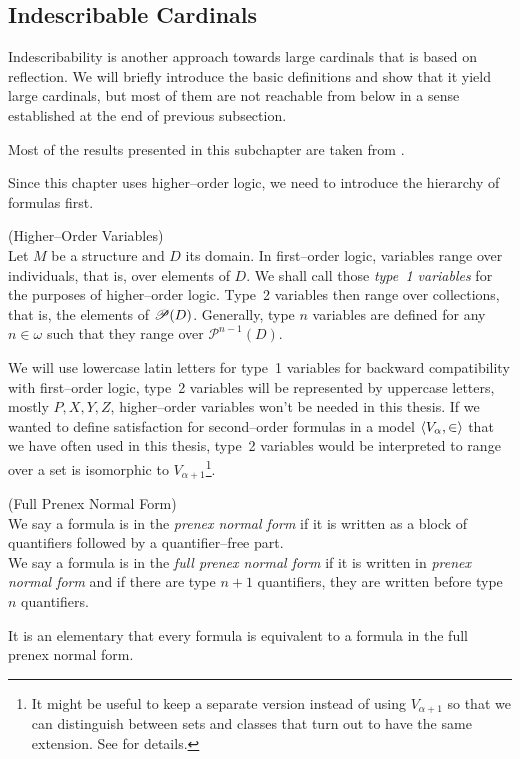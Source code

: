 \subsection{Indescribable Cardinals}

Indescribability is another approach towards large cardinals that is based on reflection. 
We will briefly introduce the basic definitions and show that it yield large cardinals, but most of them are not reachable from below in a sense established at the end of previous subsection.

Most of the results presented in this subchapter are taken from \cite{KanamoriBook}.

Since this chapter uses higher–order logic, we need to introduce the hierarchy of formulas first.

\begin{definition}{(Higher–Order Variables)}\label{def:higher_order_variables}\\
Let $M$ be a structure and $D$ its domain. In first–order logic, variables range over individuals, that is, over elements of $D$. We shall call those \emph{type~1 variables} for the purposes of higher–order logic. Type~2 variables then range over collections, that is, the elements of $\mathscr{P} (D)$. Generally, type $n$ variables are defined for any $n \in \omega$ such that they range over $\mathscr{P}^{n-1}(D)$.
\end{definition}
We will use lowercase latin letters for type~1 variables for backward compatibility with first–order logic, type~2 variables will be represented by uppercase letters, mostly $P, X, Y, Z$, higher–order variables won't be needed in this thesis. If we wanted to define satisfaction for second–order formulas in a model $\langle V_\alpha, \in \rangle$ that we have often used in this thesis, type~2 variables would be interpreted to range over a set is isomorphic to $V_{\alpha+1}$\footnote{It might be useful to keep a separate version instead of using $V_{\alpha+1}$ so that we can distinguish between sets and classes that turn out to have the same extension. See \cite{Koellner2009ORP} for details.}.

\begin{definition}{(Full Prenex Normal Form)}\label{def:pnf}\\
We say a formula is in the \emph{prenex normal form} if it is written as a block of quantifiers followed by a quantifier–free part.\\
We say a formula is in the \emph{full prenex normal form} if it is written in \emph{prenex normal form} and if there are type $n+1$ quantifiers, they are written before type $n$ quantifiers.
\end{definition}
It is an elementary that every formula is equivalent to a formula in the full prenex normal form.

